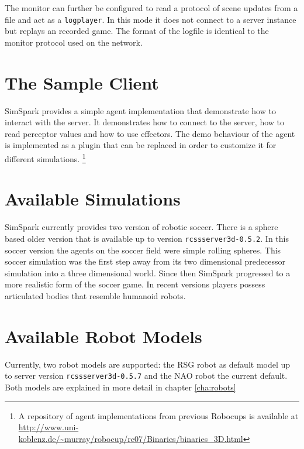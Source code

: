 The monitor can further be configured to read a protocol of scene
updates from a file and act as a \texttt{logplayer}. In this mode it
does not connect to a server instance but replays an recorded
game. The format of the logfile is identical to the monitor protocol
used on the network.

\section{The Sample Client}

SimSpark provides a simple agent implementation that demonstrate how
to interact with the server. It demonstrates how to connect to the
server, how to read perceptor values and how to use effectors. The
demo behaviour of the agent is implemented as a plugin that can be
replaced in order to customize it for different
simulations. \footnote{A repository of agent implementations from
previous Robocups is available at
\url{http://www.uni-koblenz.de/~murray/robocup/rc07/Binaries/binaries_3D.html}}

\section{Available Simulations}

SimSpark currently provides two version of robotic soccer. There is a
sphere based older version that is available up to version
\texttt{rcssserver3d-0.5.2}. In this soccer version the agents on the
soccer field were simple rolling spheres.
This soccer simulation was the first step away from its two
dimensional predecessor simulation into a three dimensional
world. Since then SimSpark progressed to a more realistic form of the
soccer game. In recent versions players possess articulated bodies
that resemble humanoid robots.

\section{Available Robot Models}

Currently, two robot models are supported: the RSG robot as default model up to
server version \texttt{rcssserver3d-0.5.7} and the NAO robot the current
default. Both models are explained in more detail in chapter \ref{cha:robots}

